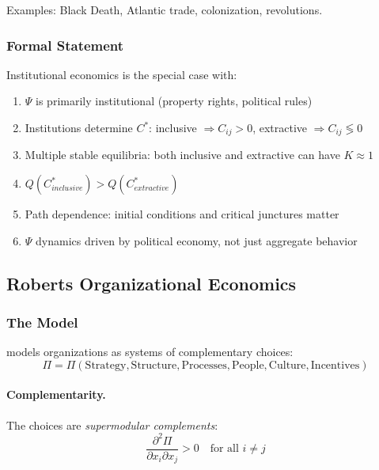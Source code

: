 Examples: Black Death, Atlantic trade, colonization, revolutions.

\subsubsection{Formal Statement}

\begin{proposition}
Institutional economics is the special case with:
\begin{enumerate}
  \item $\Psi$ is primarily institutional (property rights, political rules)
  \item Institutions determine $C^*$: inclusive $\Rightarrow C_{ij} > 0$, extractive $\Rightarrow C_{ij} \lessgtr 0$
  \item Multiple stable equilibria: both inclusive and extractive can have $K \approx 1$
  \item $Q(C^*_{inclusive}) > Q(C^*_{extractive})$
  \item Path dependence: initial conditions and critical junctures matter
  \item $\Psi$ dynamics driven by political economy, not just aggregate behavior
\end{enumerate}
\end{proposition}

\subsection{Roberts Organizational Economics}
\label{app:roberts}

\subsubsection{The Model}

\citet{roberts2004} models organizations as systems of complementary choices:
\begin{equation}
  \Pi = \Pi(\text{Strategy}, \text{Structure}, \text{Processes}, \text{People}, \text{Culture}, \text{Incentives})
\end{equation}

\paragraph{Complementarity.}
The choices are \emph{supermodular complements}:
\begin{equation}
  \frac{\partial^2 \Pi}{\partial x_i \partial x_j} > 0 \quad \text{for all } i \neq j
\end{equation}

